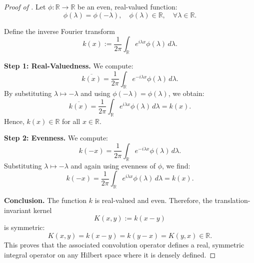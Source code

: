 \begin{proof}[Proof of ]
Let \( \phi \colon \mathbb{R} \to \mathbb{R} \) be an even, real-valued function:
\[
\phi(\lambda) = \phi(-\lambda), \quad \phi(\lambda) \in \mathbb{R}, \quad \forall \lambda \in \mathbb{R}.
\]

Define the inverse Fourier transform
\[
k(x) := \frac{1}{2\pi} \int_{\mathbb{R}} e^{i \lambda x} \phi(\lambda)\, d\lambda.
\]

\medskip
\noindent\textbf{Step 1: Real-Valuedness.}
We compute:
\[
\overline{k(x)} = \frac{1}{2\pi} \int_{\mathbb{R}} e^{-i \lambda x} \phi(\lambda)\, d\lambda.
\]
By substituting \( \lambda \mapsto -\lambda \) and using \( \phi(-\lambda) = \phi(\lambda) \), we obtain:
\[
\overline{k(x)} = \frac{1}{2\pi} \int_{\mathbb{R}} e^{i \lambda x} \phi(\lambda)\, d\lambda = k(x).
\]
Hence, \( k(x) \in \mathbb{R} \) for all \( x \in \mathbb{R} \).

\medskip
\noindent\textbf{Step 2: Evenness.}
We compute:
\[
k(-x) = \frac{1}{2\pi} \int_{\mathbb{R}} e^{-i \lambda x} \phi(\lambda)\, d\lambda.
\]
Substituting \( \lambda \mapsto -\lambda \) and again using evenness of \( \phi \), we find:
\[
k(-x) = \frac{1}{2\pi} \int_{\mathbb{R}} e^{i \lambda x} \phi(\lambda)\, d\lambda = k(x).
\]

\medskip
\noindent\textbf{Conclusion.}
The function \( k \) is real-valued and even. Therefore, the translation-invariant kernel
\[
K(x,y) := k(x - y)
\]
is symmetric:
\[
K(x,y) = k(x - y) = k(y - x) = K(y,x) \in \mathbb{R}.
\]
This proves that the associated convolution operator defines a real, symmetric integral operator on any Hilbert space where it is densely defined.
\end{proof}
